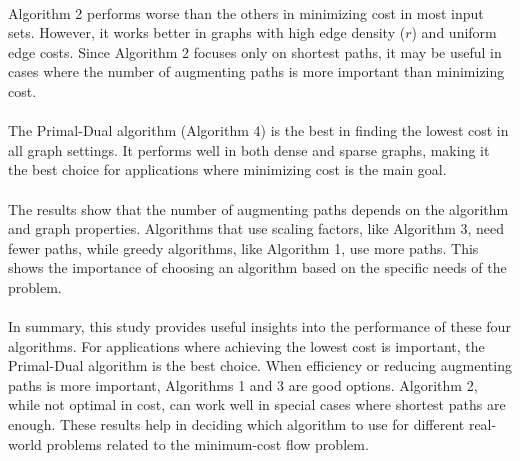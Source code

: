 \documentclass{article}
\begin{document}
\paragraph{}
Algorithm 2 performs worse than the others in minimizing cost in most input sets. However, it works better in graphs with high edge density (\( r \)) and uniform edge costs. Since Algorithm 2 focuses only on shortest paths, it may be useful in cases where the number of augmenting paths is more important than minimizing cost.

\paragraph{}
The Primal-Dual algorithm (Algorithm 4) is the best in finding the lowest cost in all graph settings. It performs well in both dense and sparse graphs, making it the best choice for applications where minimizing cost is the main goal.

\paragraph{}
The results show that the number of augmenting paths depends on the algorithm and graph properties. Algorithms that use scaling factors, like Algorithm 3, need fewer paths, while greedy algorithms, like Algorithm 1, use more paths. This shows the importance of choosing an algorithm based on the specific needs of the problem.

\paragraph{}
In summary, this study provides useful insights into the performance of these four algorithms. For applications where achieving the lowest cost is important, the Primal-Dual algorithm is the best choice. When efficiency or reducing augmenting paths is more important, Algorithms 1 and 3 are good options. Algorithm 2, while not optimal in cost, can work well in special cases where shortest paths are enough. These results help in deciding which algorithm to use for different real-world problems related to the minimum-cost flow problem.
\end{document}

